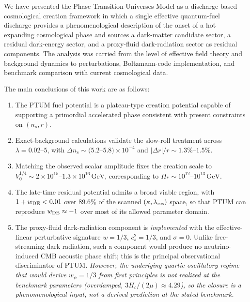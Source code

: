 \documentclass[epj]{svjour}
\begin{document}
We have presented the Phase Transition Universes Model as a
discharge-based cosmological creation framework in which a single
effective quantum-fuel discharge provides a phenomenological description
of the onset of a hot expanding cosmological phase and sources a
dark-matter candidate sector, a residual dark-energy sector, and a
proxy-fluid dark-radiation sector as residual components. The analysis was carried from the
level of effective field theory and background dynamics to
perturbations, Boltzmann-code implementation, and benchmark comparison
with current cosmological data.

The main conclusions of this work are as follows:

\begin{enumerate}[label=(\arabic*)]
\item The PTUM fuel potential is a plateau-type creation potential
      capable of supporting a primordial accelerated phase
      consistent with present constraints on $(n_s,r)$.

\item Exact-background calculations validate the slow-roll treatment
      across $\lambda=0.02$--$5$, with
      $\Delta n_s\sim(5.2$--$5.8)\times10^{-4}$ and
      $|\Delta r|/r\sim1.3\%$--$1.5\%$.

\item Matching the observed scalar amplitude fixes the creation
      scale to
      $V_0^{1/4}\sim 2\times10^{15}$--$1.3\times10^{16}\,
      \mathrm{GeV}$, corresponding to
      $H_*\sim10^{12}$--$10^{13}\,\mathrm{GeV}$.

\item The late-time residual potential admits a broad viable region,
      with $1+w_{\rm DE}<0.01$ over 89.6\% of the scanned
      $(\kappa,\lambda_{\rm res})$ space, so that PTUM can
      reproduce $w_{\rm DE}\approx -1$ over most of its allowed
      parameter domain.

\item The proxy-fluid dark-radiation component is \emph{implemented}
      with the effective-linear perturbative signature
      $w=1/3$, $c_s^2=1/3$, and $\sigma=0$. Unlike free-streaming
      dark radiation, such a component would produce no
      neutrino-induced CMB acoustic phase shift; this is the principal
      observational discriminator of PTUM. \emph{However, the
      underlying quartic oscillatory regime that would derive
      $w_\psi=1/3$ from first principles is not realized at the
      benchmark parameters (overdamped, $3H_c/(2\mu)\approx4.29$), so the
      closure is a phenomenological input, not a derived prediction
      at the stated benchmark.}


\end{enumerate}
\end{document}
